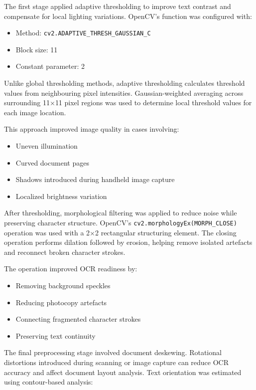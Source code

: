 The first stage applied adaptive thresholding to improve text contrast and compensate for local lighting variations. OpenCV's  function was configured with:

\begin{itemize}
    \item Method: \texttt{cv2.ADAPTIVE\_THRESH\_GAUSSIAN\_C}
    \item Block size: 11
    \item Constant parameter: 2
\end{itemize}
Unlike global thresholding methods, adaptive thresholding calculates threshold values from neighbouring pixel intensities. Gaussian-weighted averaging across surrounding 11$\times$11 pixel regions was used to determine local threshold values for each image location.

This approach improved image quality in cases involving:

\begin{itemize}
    \item Uneven illumination
    \item Curved document pages
    \item Shadows introduced during handheld image capture
    \item Localized brightness variation
\end{itemize}

After thresholding, morphological filtering was applied to reduce noise while preserving character structure. OpenCV's \texttt{cv2.morphologyEx(MORPH\_CLOSE)} operation was used with a 2$\times$2 rectangular structuring element. The closing operation performs dilation followed by erosion, helping remove isolated artefacts and reconnect broken character strokes.

The operation improved OCR readiness by:

\begin{itemize}
\item Removing background speckles
\item Reducing photocopy artefacts
\item Connecting fragmented character strokes
\item Preserving text continuity
\end{itemize}

The final preprocessing stage involved document deskewing. Rotational distortions introduced during scanning or image capture can reduce OCR accuracy and affect document layout analysis. Text orientation was estimated using contour-based analysis:

